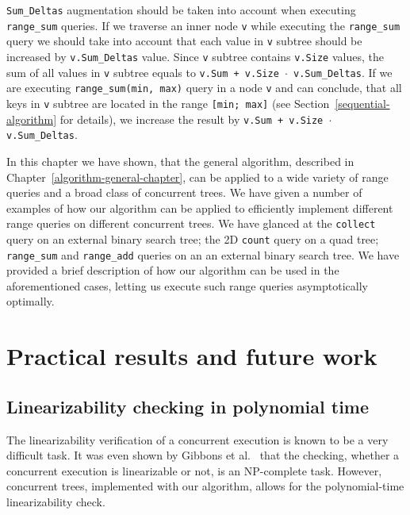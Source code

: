 \documentclass[times, dvipsnames,%
               languages={russian,english} %
              ]{itmo-student-thesis}
\begin{document}
\bigbreak

\texttt{Sum\_Deltas} augmentation should be taken into account when executing \texttt{range\_sum} queries. If we traverse an inner node \texttt{v} while executing the \texttt{range\_sum} query we should take into account that each value in \texttt{v} subtree should be increased by \texttt{v.Sum\_Deltas} value. Since \texttt{v} subtree contains \texttt{v.Size} values, the sum of all values in \texttt{v} subtree equals to \texttt{v.Sum + v.Size $\cdot$ v.Sum\_Deltas}. If we are executing \texttt{range\_sum(min, max)} query in a node \texttt{v} and can conclude, that all keys in \texttt{v} subtree are located in the range \texttt{[min; max]} (see Section~\ref{sequential-algorithm} for details), we increase the result by \texttt{v.Sum + v.Size $\cdot$ v.Sum\_Deltas}.

\chapterconclusion

In this chapter we have shown, that the general algorithm, described in Chapter~\ref{algorithm-general-chapter}, can be applied to a wide variety of range queries and a broad class of concurrent trees. We have given a number of examples of how our algorithm can be applied to efficiently implement different range queries on different concurrent  trees. We have glanced at the \texttt{collect} query on an external binary search tree; the 2D \texttt{count} query on a quad tree; \texttt{range\_sum} and \texttt{range\_add} queries on an an external binary search tree. We have provided a brief description of how our algorithm can be used in the aforementioned cases, letting us execute such range queries asymptotically optimally.

\chapter{Practical results and future work}

\section{Linearizability checking in polynomial time}

The linearizability verification of a concurrent execution is known to be a very difficult task. It was even shown by Gibbons et al.~\cite{gibbons1997testing} that the checking, whether a concurrent execution is linearizable or not, is an NP-complete task. However, concurrent trees, implemented with our algorithm, allows for the polynomial-time linearizability check.
\end{document}
